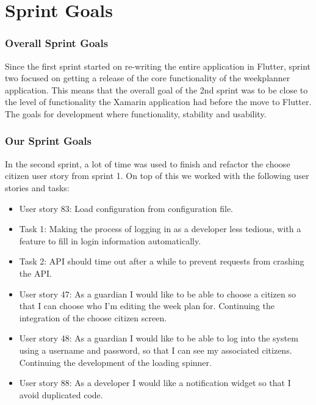 \section{Sprint Goals}
\label{sect:sprintGoals2}
\subsubsection{Overall Sprint Goals}
Since the first sprint started on re-writing the entire application in Flutter, sprint two focused on getting a release of the core functionality of the weekplanner application. This means that the overall goal of the 2nd sprint was to be close to the level of functionality the Xamarin application had before the move to Flutter. The goals for development where functionality, stability and usability. 

\subsubsection{Our Sprint Goals}
In the second sprint, a lot of time was used to finish and refactor the choose citizen user story from sprint 1. On top of this we worked with the following user stories and tasks:

\begin{itemize}
    \item User story 83: Load configuration from configuration file.
    \item Task 1: Making the process of logging in as a developer less tedious, with a feature to fill in login information automatically.
    \item Task 2: API should time out after a while to prevent requests from crashing the API. 
    \item User story 47: As a guardian I would like to be able to choose a citizen so that I can choose who I’m editing the week plan for.
    \subitem Continuing the integration of the choose citizen screen.
    \item User story 48: As a guardian I would like to be able to log into the system using a username and password, so that I can see my associated citizens.
    \subitem Continuing the development of the loading spinner.
    \item User story 88: As a developer I would like a notification widget so that I avoid duplicated code.
\end{itemize}